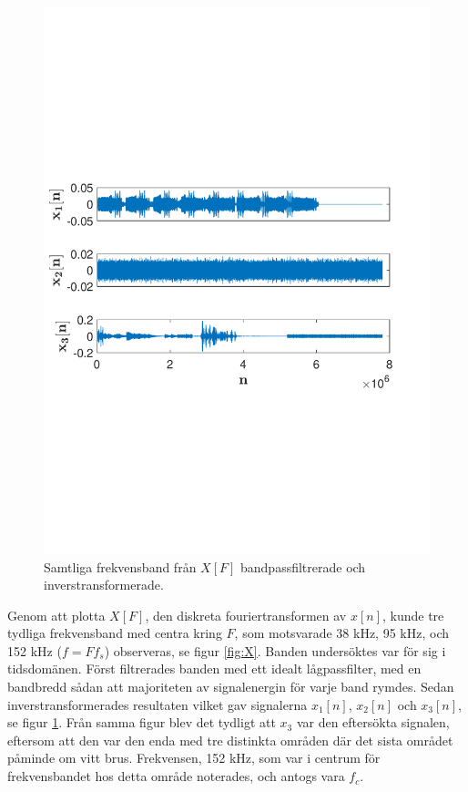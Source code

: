 \documentclass[10pt,twocolumn,a4paper]{article}
\begin{document}
\begin{figure}[width=\textwidth]
    \includegraphics[trim = 0 80mm 0 90mm, clip, width=\linewidth]{fig3.pdf}
    \caption{
        Samtliga frekvensband från $X[F]$ bandpassfiltrerade och inverstransformerade. 
        \label{fig:xt}
    }
\end{figure}

Genom att plotta $X[F]$, den diskreta fouriertransformen av $x[n]$, kunde tre
tydliga frekvensband med centra kring $F$, som motsvarade 38 kHz, 95 kHz, och
152 kHz ($f = F f_s$) observeras, se figur \ref{fig:X}. Banden undersöktes var
för sig i tidsdomänen. Först filtrerades banden med ett idealt lågpassfilter,
med en bandbredd sådan att majoriteten av signalenergin för varje band rymdes.
Sedan inverstransformerades resultaten vilket gav signalerna $x_1[n]$, $x_2[n]$
och $x_3[n]$, se figur \ref{fig:xt}. Från samma figur blev det tydligt att
$x_3$ var den eftersökta signalen, eftersom att den var den enda med tre
distinkta områden där det sista området påminde om vitt brus. Frekvensen, 152
kHz, som var i centrum för frekvensbandet hos detta område noterades, och
antogs vara $f_c$. 
\end{document}
